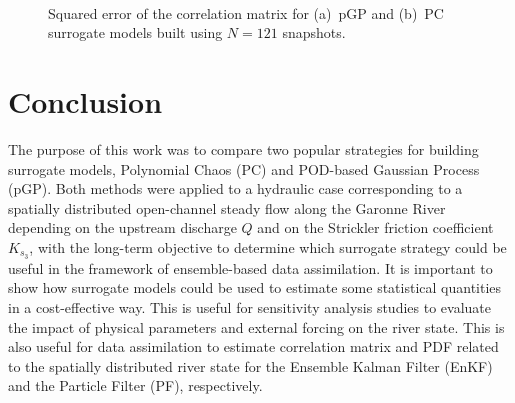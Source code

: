 \begin{figure}[!h]               
\centering
{}
 ~ 
\caption{Squared error of the correlation matrix for (a)~pGP and (b)~PC surrogate models built using $N = 121$ snapshots.}
\label{fig:corr-mse}
\end{figure}

\section{Conclusion}\label{sec:ccl}

The purpose of this work was to compare two popular strategies for building surrogate models, Polynomial Chaos (PC) and POD-based Gaussian Process (pGP). Both methods were applied to a hydraulic case corresponding to a spatially distributed open-channel steady flow along the Garonne River depending on the upstream discharge $Q$ and on the Strickler friction coefficient $K_{s_3}$, with the long-term objective to determine which surrogate strategy could be useful in the framework of ensemble-based data assimilation. It is important to show how surrogate models could be used to estimate some statistical quantities in a cost-effective way. This is useful for sensitivity analysis studies to evaluate the impact of physical parameters and external forcing on the river state. This is also useful for data assimilation to estimate correlation matrix and PDF related to the spatially distributed river state for the Ensemble Kalman Filter (EnKF) and the Particle Filter (PF), respectively.

